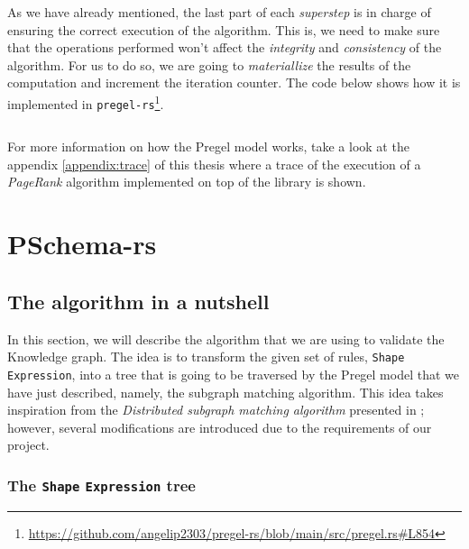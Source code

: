 \begin{code}
    \inputminted{rust}{code/listings/11-6_vprog.rs}
\end{code}

As we have already mentioned, the last part of each \textit{superstep} is in charge of ensuring the correct execution of the algorithm. This is, we need to make sure that the operations performed won't affect the \textit{integrity} and \textit{consistency} of the algorithm. For us to do so, we are going to \textit{materiallize} the results of the computation and increment the iteration counter. The code below shows how it is implemented in \texttt{pregel-rs}\footnote{\url{https://github.com/angelip2303/pregel-rs/blob/main/src/pregel.rs\#L854}}.

\begin{code}
    \inputminted{rust}{code/listings/11-7_collect.rs}
\end{code}

For more information on how the Pregel model works, take a look at the appendix \ref{appendix:trace} of this thesis where a trace of the execution of a \textit{PageRank} algorithm implemented on top of the library is shown.

\section{PSchema-rs}

\subsection{The algorithm in a nutshell}

In this section, we will describe the algorithm that we are using to validate the Knowledge graph. The idea is to transform the given set of rules, \texttt{Shape} \texttt{Expression}, into a tree that is going to be traversed by the Pregel model that we have just described, namely, the subgraph matching algorithm. This idea takes inspiration from the \textit{Distributed subgraph matching algorithm} presented in \cite{Xu2019}; however, several modifications are introduced due to the requirements of our project.

\subsubsection{The \texttt{Shape} \texttt{Expression} tree}

